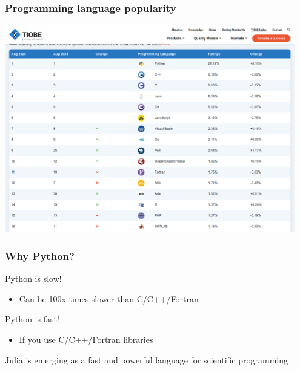 \documentclass[handout]{beamer}
\begin{document}
\begin{frame}[fragile]
  \frametitle{Programming language popularity}
  \begin{center}
  \includegraphics[width=0.95\textwidth]{TIOBE-2025.png}
  \end{center}
\end{frame}

\begin{frame}[fragile]
  \frametitle{Why Python?}
  \begin{block}{Python is slow!}
  \begin{itemize}
  \item Can be 100x times slower than C/C++/Fortran
  \end{itemize}
  \end{block}\pause
  \begin{block}{Python is fast!}
  \begin{itemize}
  \item If you use C/C++/Fortran libraries
  \end{itemize}
  \end{block}\pause
  \begin{alertblock}{}
  \centering Julia is emerging as a fast and powerful language for scientific programming
  \end{alertblock}
\end{frame}


\end{document}
